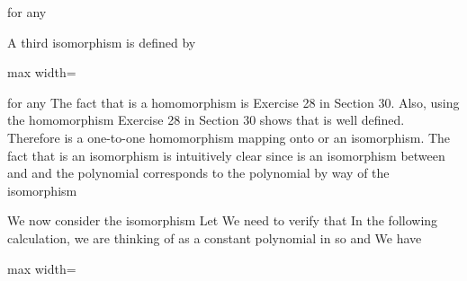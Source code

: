 \documentclass[11pt,oneside]{article}
\begin{document}
\begin{BookBody}
\noindent for any 

A third isomorphism is  defined by

\begin{center}\begin{adjustbox}{max width=\linewidth}\end{adjustbox}\end{center}

\noindent for any  The fact that \BookInline{\theta } is a homomorphism is Exercise 28 in Section 30. Also, using the homomorphism  Exercise 28 in Section 30 shows that  is well defined. Therefore\BookInline{,\allowbreak \theta } is a one-to-one homomorphism mapping onto  or an isomorphism. The fact that \BookInline{\theta } is an isomorphism is intuitively clear since \BookInline{\sigma } is an isomorphism between  and  and the polynomial  corresponds to the polynomial  by way of the isomorphism 

We now consider the isomorphism  Let  We need to verify that  In the following calculation, we are thinking of  as a constant polynomial in  so  and  We have

\begin{center}\begin{adjustbox}{max width=\linewidth}\end{adjustbox}\end{center}


\end{BookBody}
\end{document}
